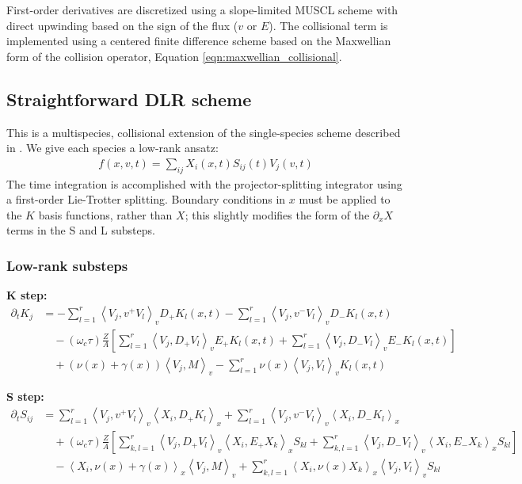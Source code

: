 \documentclass{article}
\begin{document}
First-order derivatives are discretized using a slope-limited MUSCL scheme with direct upwinding based on the
sign of the flux ($v$ or $E$).
The collisional term is implemented using a centered finite difference scheme based on the Maxwellian
form of the collision operator, Equation \eqref{eqn:maxwellian_collisional}.

\subsection{Straightforward DLR scheme}

This is a multispecies, collisional extension of the single-species scheme described in
\cite{einkemmerLowRankProjectorSplittingIntegrator2018}.
We give each species a low-rank ansatz:
\begin{align*}
    f(x, v, t) = \sum_{ij} X_i(x, t) S_{ij}(t) V_j(v, t)
\end{align*}
The time integration is accomplished with the projector-splitting integrator using a first-order
Lie-Trotter splitting.
Boundary conditions in $x$ must be applied to the $K$ basis functions, rather than $X$; this slightly modifies
the form of the $\partial_x X$ terms in the S and L substeps.

\subsubsection{Low-rank substeps}

\textbf{K step:}
\begin{align*}
    \partial_t K_j &= -\sum_{l=1}^r \left\langle V_j, v^+ V_l \right\rangle_v D_+ K_l(x, t) - \sum_{l=1}^r \left\langle V_j, v^- V_l \right\rangle_v D_- K_l(x, t)  \\
                         &\quad - (\omega_c \tau) \frac{Z}{A} \left[ \sum_{l=1}^r \left\langle V_j, D_+ V_l \right\rangle_v E_+ K_l(x, t) + \sum_{l=1}^r \left\langle V_j, D_- V_l \right\rangle_v E_- K_l(x, t) \right] \\
                         &\quad + (\nu(x) + \gamma(x)) \left\langle V_j, M \right\rangle_v - \sum_{l=1}^r \nu(x)  \left\langle V_j, V_l \right\rangle_v K_l(x, t)
\end{align*}

\textbf{S step:}
\begin{align*}
    \partial_t S_{ij} &= \sum_{l=1}^r \left\langle V_j, v^+ V_l \right\rangle_v \left\langle X_i, D_+ K_l \right\rangle_x + \sum_{l=1}^r \left\langle V_j, v^- V_l \right\rangle_v \left\langle X_i, D_- K_l \right\rangle_x \\
                      &\quad + (\omega_c \tau) \frac{Z}{A} \left[ \sum_{k,l=1}^r \left\langle V_j, D_+ V_l \right\rangle_v \left\langle X_i, E_+ X_k \right\rangle_x S_{kl} + \sum_{k,l=1}^r \left\langle V_j, D_- V_l \right\rangle_v \left\langle X_i, E_- X_k \right\rangle_x S_{kl} \right] \\
                      &\quad - \left\langle X_i, \nu(x) +\gamma(x) \right\rangle_x \left\langle V_j, M \right\rangle_v + \sum_{k,l=1}^r \left\langle X_i, \nu(x) X_k \right\rangle_x \left\langle V_j, V_l \right\rangle_v  S_{kl}
\end{align*}
\end{document}
